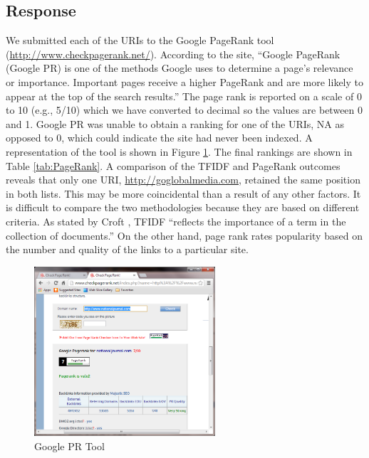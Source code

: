 \documentclass[letterpaper,11pt]{report}
\begin{document}
\begin{savenotes}
\subsection{Response}We submitted each of the URIs to the Google PageRank tool (\url{http://www.checkpagerank.net/}). According to the site, ``Google PageRank (Google PR) is one of the methods Google uses to determine a page's relevance or importance. Important pages receive a higher PageRank and are more likely to appear at the top of the search results.'' The page rank is reported on a scale of 0 to 10 (e.g., 5/10) which we have converted to decimal so the values are between 0 and 1.  Google PR was unable to obtain a ranking for one of the URIs, NA as opposed to 0, which could indicate the site had never been indexed. A representation of the tool is shown in Figure \ref{fig:CheckPageRank}. The final rankings are shown in Table \ref{tab:PageRank}. A comparison of the TFIDF and PageRank outcomes reveals that only one URI, \url{http://goglobalmedia.com}, retained the same position in both lists. This may be more coincidental than a result of any other factors. It is difficult to compare the two methodologies because they are based on different criteria. As stated by Croft \cite{croft2010search}, TFIDF ``reflects the importance of a term in the collection of documents.'' On the other hand, page rank rates popularity based on the number and quality of the links to a particular site.

\begin{figure}[htbp]
	\centering
		\includegraphics[width=0.60\textwidth]{CheckPageRank.png}
	\caption{Google PR Tool}
	\label{fig:CheckPageRank}
\end{figure}



\end{savenotes}
\end{document}
